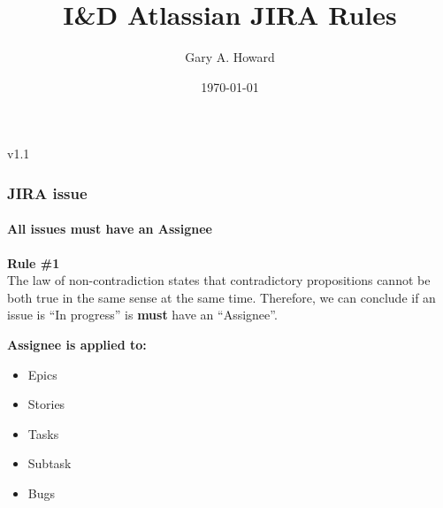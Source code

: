 \documentclass[10pt]{beamer}%
\title{I\&D Atlassian JIRA Rules}%
\date{\today}%
\author{Gary A. Howard}%
\begin{document}
%


\begin{frame}%
\titlepage%
\begin{center}%
  \textcolor{HavasuBlue}{v1.1}%
\end{center}%
\end{frame}%


\begin{frame}%
  \frametitle{\hspace{4mm}JIRA issue}%
  \framesubtitle{\hspace{4mm}All issues must have an Assignee}%
  \begin{mdframed}[style=HavasuLightBlueStyle]%
    \textbf{Rule \#1}\\%
    The law of non-contradiction states that contradictory propositions cannot
    be both true in the same sense at the same time.  Therefore, we can conclude
    if an issue is ``In progress'' is \textbf{must} have an ``Assignee''.
  \end{mdframed}%
  \begin{mdframed}[style=HavasuLightGreenStyle]%
    \textbf{Assignee is applied to:}%
    \begin{itemize}%
      \item Epics%
      \item Stories%
      \item Tasks%
      \item Subtask%
      \item Bugs%
    \end{itemize}%
  \end{mdframed}%
\end{frame}%

\end{document}
